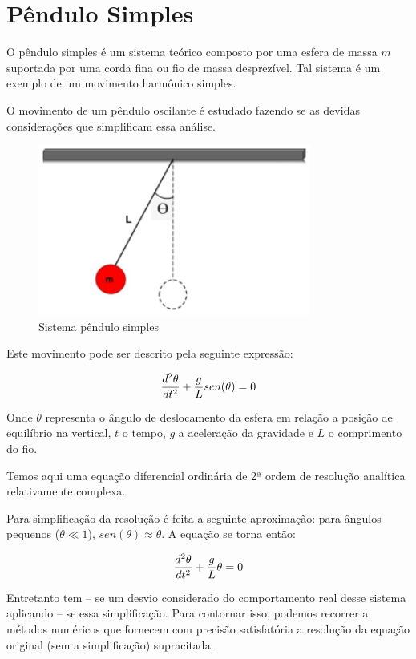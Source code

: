 \section{Pêndulo Simples}

O pêndulo simples é um sistema teórico composto por uma esfera de massa $m$ suportada por uma corda fina ou fio de massa desprezível. Tal sistema é um exemplo de um movimento harmônico simples.

O movimento de um pêndulo oscilante é estudado fazendo se as devidas considerações que simplificam essa análise.

\begin{figure}[H]
	\centering
	\includegraphics[width=0.8\textwidth]{./Imagens/Pendulo simples/ps1.png} 
	\caption{Sistema pêndulo simples}
	\label{fig:PS1}
\end{figure}

Este movimento pode ser descrito pela seguinte expressão:

$$\Large \frac{d^2\theta}{dt^2} + \frac{g}{L}sen(\theta) = 0$$

Onde $\theta$ representa o ângulo de deslocamento da esfera em relação a posição de equilíbrio na vertical, $t$  o tempo, $g$ a aceleração da gravidade e $L$ o comprimento do fio.

Temos aqui uma equação diferencial ordinária de 2ª ordem de resolução analítica relativamente complexa.

Para simplificação da resolução é feita a seguinte aproximação: para ângulos pequenos ($\theta \ll 1$),  $sen(\theta)  \approx  \theta$.  A equação se torna então: 

$$\Large \frac{d^2\theta}{dt^2} + \frac{g}{L}\theta = 0$$

Entretanto tem – se um desvio considerado do comportamento real desse sistema aplicando – se essa simplificação. Para contornar isso, podemos recorrer a métodos numéricos que fornecem com precisão satisfatória a resolução da equação original (sem a simplificação) supracitada.

